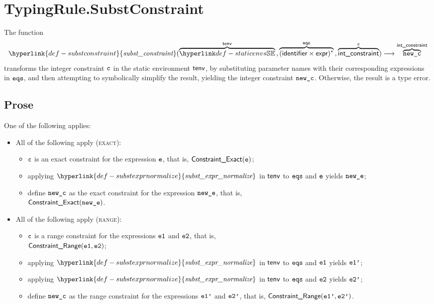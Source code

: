 \documentclass{book}
\newcommand\ProseOtherwiseTypeError[0]{Otherwise, the result is a type error.}
\newcommand\substexprnormalize[0]{\hyperlink{def-substexprnormalize}{\textfunc{subst\_expr\_normalize}}}
\newcommand\substconstraint[0]{\hyperlink{def-substconstraint}{\textfunc{subst\_constraint}}}
\begin{document}

\section{TypingRule.SubstConstraint \label{sec:TypingRule.SubstConstraint}}
\hypertarget{def-substconstraint}{}
The function
\[
\substconstraint(
  \overname{\staticenvs}{\tenv} \aslsep
  \overname{(\identifier\times\expr)^*}{\eqs} \aslsep
  \overname{\intconstraint}{\vc}
) \aslto \overname{\newc}{\intconstraint}
\]
transforms the integer constraint $\texttt{c}$ in the static environment $\textsf{tenv}$,
by substituting parameter names with their corresponding expressions in
$\texttt{eqs}$, and then attempting to symbolically simplify the result,
yielding the integer constraint $\texttt{new\_c}$.
\ProseOtherwiseTypeError

\subsection{Prose}
One of the following applies:
\begin{itemize}
  \item All of the following apply (\textsc{exact}):
  \begin{itemize}
    \item $\texttt{c}$ is an exact constraint for the expression $\texttt{e}$, that is, $\textsf{Constraint\_Exact}(\texttt{e})$;
    \item applying $\substexprnormalize$ in $\textsf{tenv}$ to $\texttt{eqs}$ and $\texttt{e}$ yields $\texttt{new\_e}$;
    \item define $\texttt{new\_c}$ as the exact constraint for the expression $\texttt{new\_e}$, that is, \\
          $\textsf{Constraint\_Exact}(\texttt{new\_e})$.
  \end{itemize}

  \item All of the following apply (\textsc{range}):
  \begin{itemize}
    \item $\texttt{c}$ is a range constraint for the expressions $\texttt{e1}$ and $\texttt{e2}$, that is, \\
          $\textsf{Constraint\_Range}(\texttt{e1}, \texttt{e2})$;
    \item applying $\substexprnormalize$ in $\textsf{tenv}$ to $\texttt{eqs}$ and $\texttt{e1}$ yields $\texttt{e1'}$;
    \item applying $\substexprnormalize$ in $\textsf{tenv}$ to $\texttt{eqs}$ and $\texttt{e2}$ yields $\texttt{e2'}$;
    \item define $\texttt{new\_c}$ as the range constraint for the expressions $\texttt{e1'}$ and $\texttt{e2'}$, that is, $\textsf{Constraint\_Range}(\texttt{e1'}, \texttt{e2'})$.
  \end{itemize}
\end{itemize}
\end{document}
